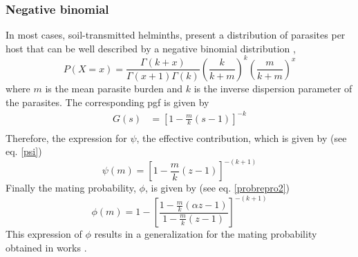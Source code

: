 \documentclass[12pt,a4paper]{article}
\theoremstyle{plain}%
\theoremstyle{definition}
\theoremstyle{remark}
\begin{document}
	\subsubsection{Negative binomial}
	In most cases, soil-transmitted helminths, present a distribution of parasites per host that can be well described by a negative binomial distribution \citep{bundy1987epidemiology,hoagland1978necator,seo1979frequency},
	\begin{equation}
	P(X=x)=\frac{\Gamma(k+x)}{\Gamma(x+1)\Gamma(k)}\left( \frac{k}{k+m}\right) ^k \left( \frac{m}{k+m}\right) ^x
	\end{equation}
	where $m$ is the mean parasite burden and $k$ is the inverse dispersion parameter of the parasites. The corresponding pgf is given by
	\begin{equation}
	\begin{split}
	G(s)&=\left[ 1-\frac{m}{k}(s-1)\right] ^{-k}\\
	\end{split}
	\end{equation}
	Therefore, 
	the expression for $\psi$, the effective contribution, which is given by (see eq. \eqref{psi})
	\begin{equation}\label{phibn}
	\psi(m)=\left[ 1-\frac{m}{k}(z-1)\right] ^{-(k+1)} 
	\end{equation}     
	Finally the mating probability, $\phi$, is given by (see eq. \eqref{probrepro2})
	\begin{equation} 
	\phi(m)=
	1-\left[ \frac{ 1-\frac{m}{k}(\alpha z-1)}{1-\frac{m}{k}(z-1) }\right]  ^{-(k+1)} 
	\end{equation}
	This expression of $\phi$ results in a generalization for the mating probability obtained in works  \cite{anderson1992infectious,may1993biased,may1977togetherness}.
		
\end{document}
